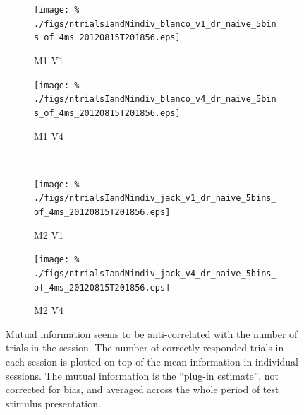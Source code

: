 %
%
% 
% 
\begin{figure}[htbp]
    \begin{subfigure}[b]{0.5\linewidth}
        \centering
        \caption{M1 V1}
        \label{fig:IandNb1}
        \texttt{[image: \%
./figs/ntrialsIandNindiv\_blanco\_v1\_dr\_naive\_5bins\_of\_4ms\_20120815T201856.eps]}
    \end{subfigure}
    \begin{subfigure}[b]{0.5\linewidth}
        \centering
        \caption{M1 V4}
        \label{fig:IandNb4}
        \texttt{[image: \%
./figs/ntrialsIandNindiv\_blanco\_v4\_dr\_naive\_5bins\_of\_4ms\_20120815T201856.eps]}
    \end{subfigure}
    \\
    \begin{subfigure}[b]{0.5\linewidth}
        \centering
        \caption{M2 V1}
        \label{fig:IandNj1}
        \texttt{[image: \%
./figs/ntrialsIandNindiv\_jack\_v1\_dr\_naive\_5bins\_of\_4ms\_20120815T201856.eps]}
    \end{subfigure}
    \begin{subfigure}[b]{0.5\linewidth}
        \centering
        \caption{M2 V4}
        \label{fig:IandNj4}
        \texttt{[image: \%
./figs/ntrialsIandNindiv\_jack\_v4\_dr\_naive\_5bins\_of\_4ms\_20120815T201856.eps]}
    \end{subfigure}
    \caption{Mutual information seems to be anti-correlated with the number of trials in the session. The number of correctly responded trials in each session is plotted on top of the mean information in individual sessions. The mutual information is the ``plug-in estimate'', not corrected for bias, and averaged across the whole period of test stimulus presentation.
}
    \label{fig:IandN}
\end{figure}

